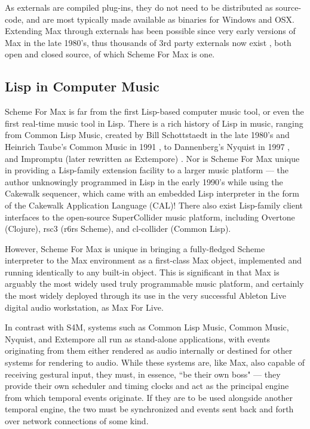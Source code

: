 \documentclass[acmsmall, anonymous, review]{acmart}
\begin{document}
As externals are compiled plug-ins, they do not need to be distributed as source-code, and
are most typically made available as binaries for Windows and OSX. Extending Max through externals has 
been possible since very early versions of Max in the late 1980's,
thus thousands of 3rd party externals 
now exist \cite{MaxObjects2021}, both open and closed source, of which Scheme For Max is one.


\subsection{Lisp in Computer Music}

Scheme For Max is far from the first Lisp-based computer music tool, or even
the first real-time music tool in Lisp. There is a rich history of Lisp in music, 
ranging from Common Lisp Music, created by Bill Schottstaedt in the late 1980's
\cite{Wang17} and Heinrich Taube's Common Music in 1991 \cite{Taube91},
to Dannenberg's Nyquist in 1997 \cite{Dannenberg97},
and Impromptu (later rewritten as Extempore) \cite{Sorensen2010}. 
Nor is Scheme For Max unique in providing a Lisp-family
extension facility to a larger music platform --- the author unknowingly
programmed in Lisp in the early 1990's while using the Cakewalk sequencer,
which came with an embedded Lisp interpreter in the form of the 
Cakewalk Application Language (CAL)! There also exist Lisp-family client interfaces
to the open-source SuperCollider music platform, including Overtone (Clojure),
rsc3 (r6rs Scheme), and cl-collider (Common Lisp).

However, Scheme For Max is unique in bringing a fully-fledged Scheme interpreter
to the Max environment as a first-class Max object, implemented and running
identically to any built-in object. This is significant in that Max
is arguably the most widely used truly programmable
music platform, and certainly the most widely deployed through its use in 
the very successful Ableton Live digital audio workstation, as Max For Live.

In contrast with S4M, systems such as Common Lisp Music, Common Music, Nyquist, and Extempore
all run as stand-alone applications, with events originating from them either
rendered as audio internally or destined for other systems for rendering to audio. 
While these systems are, like Max, also capable
of receiving gestural input, they must, in essence, ``be their own boss" --- they provide
their own scheduler and timing clocks and act as the principal engine from which temporal
events originate. If they are to be used alongside another temporal engine, the two
must be synchronized and events sent back and forth over network connections of some kind.
\end{document}
